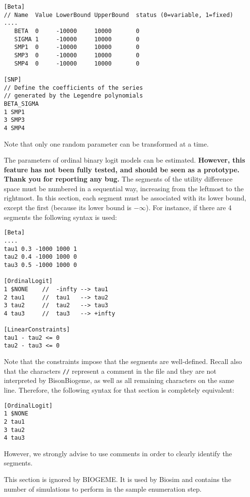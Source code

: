 \documentclass[12pt,a4paper]{article}
\newcommand{\specitem}[1]{\texttt{[#1]}}
\newcommand{\BBIOGEME}{BisonBiogeme}
\begin{document}
\begin{description}
\begin{verbatim}
[Beta]
// Name  Value LowerBound UpperBound  status (0=variable, 1=fixed)
....
   BETA  0     -10000     10000       0
   SIGMA 1     -10000     10000       0  
   SMP1  0     -10000     10000       0
   SMP3  0     -10000     10000       0
   SMP4  0     -10000     10000       0

[SNP]
// Define the coefficients of the series 
// generated by the Legendre polynomials
BETA_SIGMA
1 SMP1
3 SMP3
4 SMP4
\end{verbatim}


Note that only one random parameter can be transformed  at a time. 

\item[\specitem{OrdinalLogit}] The parameters of ordinal binary logit
models  can be estimated. \textbf{However,
this feature has not been fully tested, and should be seen as a
prototype. Thank you for reporting any bug.} The segments of the
utility difference space must be numbered in a sequential  way,
increasing from the leftmost to the rightmost. In this section, each
segment must be associated with its lower bound, except the first
(because its lower bound is $-\infty$). For instance, if there are 4
segments the following
syntax is used:  

\begin{verbatim}
[Beta]
....
tau1 0.3 -1000 1000 1
tau2 0.4 -1000 1000 0 
tau3 0.5 -1000 1000 0 

[OrdinalLogit]
1 $NONE    //  -infty --> tau1 
2 tau1     //  tau1   --> tau2
3 tau2     //  tau2   --> tau3
4 tau3     //  tau3   --> +infty

[LinearConstraints]
tau1 - tau2 <= 0
tau2 - tau3 <= 0
\end{verbatim}

Note that the constraints impose that the segments are well-defined.
Recall also that the characters \verb+//+ represent a comment in the file and they are not interpreted by \BBIOGEME , as well as all remaining characters on the same line. Therefore, the following syntax for that section is completely equivalent:
\begin{verbatim}
[OrdinalLogit]
1 $NONE
2 tau1 
3 tau2 
4 tau3 
\end{verbatim}

However, we strongly advise to use comments in order to clearly identify the segments.
   \item[\specitem{SampleEnum}] This section is ignored by BIOGEME. It is
      used by Biosim and contains the number of simulations to perform in
      the sample enumeration step.


\end{description}
\end{document}
